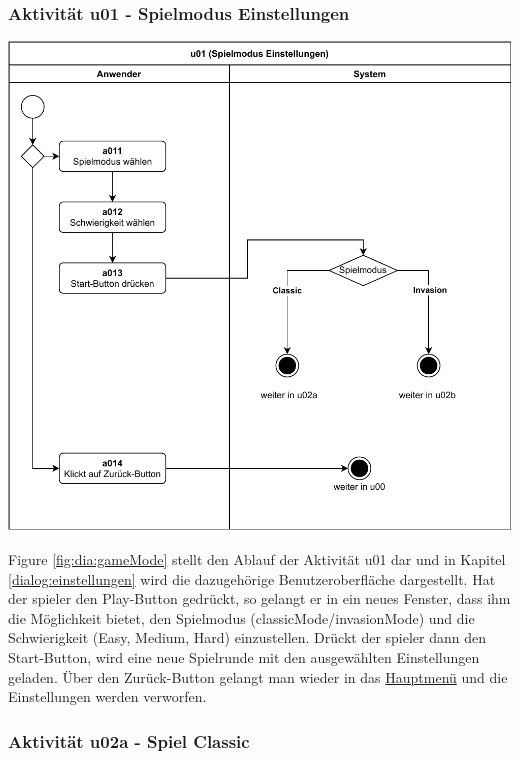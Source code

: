 \clearpage

\subsubsection{Aktivität u01 - Spielmodus Einstellungen}

\vspace*{1cm}
   
\includegraphics[width=\linewidth]{diagramme/pdf/UML-Activity-u01.pdf}
\label{fig:dia:gameMode}
\vspace*{0.5cm}

Figure \ref{fig:dia:gameMode} stellt den Ablauf der Aktivität u01 dar und in Kapitel \ref{dialog:einstellungen} wird die dazugehörige Benutzeroberfläche dargestellt.
Hat der \gls{spieler} den Play-Button gedrückt, so gelangt er in ein neues Fenster, dass ihm die Möglichkeit bietet, den Spielmodus (\gls{classicMode}/\gls{invasionMode}) und die Schwierigkeit (Easy, Medium, Hard) einzustellen. Drückt der \gls{spieler} dann den Start-Button, wird eine neue Spielrunde mit den ausgewählten Einstellungen geladen. Über den Zurück-Button gelangt man wieder in das \hyperref[fig:dia:mainMenu]{Hauptmenü} und die Einstellungen werden verworfen.

\clearpage

\subsubsection{Aktivität u02a - Spiel Classic}

